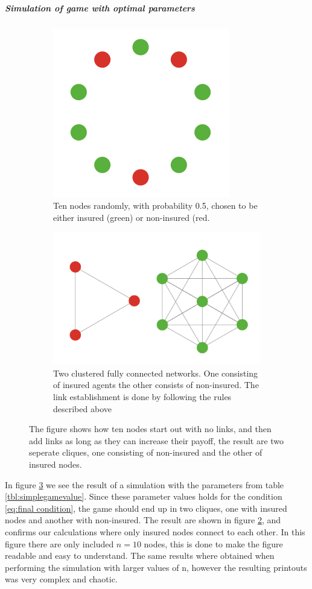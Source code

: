 \subparagraph{Simulation of game with optimal parameters}
\begin{figure}[h]
\centering
\begin{subfigure}{.5\textwidth}
  \centering
  \includegraphics[width=0.4\linewidth]{../Figures/FirstSimulationStart.png}
  \caption{\label{fig:firstsimulationstart} Ten nodes randomly, with probability 0.5, chosen to be either insured (green) or non-insured (red.}
\end{subfigure}
\quad
\begin{subfigure}{.46\textwidth}
  \centering
  \includegraphics[width=0.8\linewidth]{../Figures/FirstSimulationResult.png}
  \caption{\label{fig:firstsimulationresult} Two clustered fully connected networks. One consisting of insured agents the other consists of non-insured. The link establishment is done by following the rules described above}
\end{subfigure}
\caption{\label{fig:firstsimulation} The figure shows how ten nodes start out with no links, and then add links as long as they can increase their payoff, the result are two seperate cliques, one consisting of non-insured and the other of insured nodes.}
\end{figure}
In figure \ref{fig:firstsimulation} we see the result of a simulation with the parameters from table \ref{tbl:simplegamevalue}. Since these parameter values holds for the condition \ref{eq:final condition}, the game should end up in two cliques, one with insured nodes and another with non-insured. The result are shown in figure \ref{fig:firstsimulationresult}, and confirms our calculations where only insured nodes connect to each other.  
In this figure there are only included $n=10$ nodes, this is done to make the figure readable and easy to understand.
The same results where obtained when performing the simulation with larger values of n, however the resulting printouts was very complex and chaotic.


